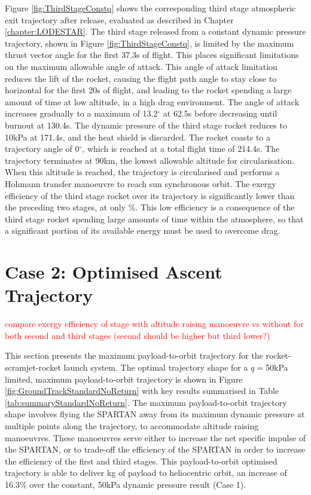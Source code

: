 Figure \ref{fig:ThirdStageConstq} shows the corresponding third stage atmospheric exit trajectory after release, evaluated as described in Chapter \ref{chapter:LODESTAR}. The third stage released from a constant dynamic pressure trajectory, shown in Figure \ref{fig:ThirdStageConstq}, is limited by the maximum thrust vector angle for the first 37.3s of flight. This places significant limitations on the maximum allowable angle of attack. This angle of attack limitation reduces the lift of the rocket, causing the flight path angle to stay close to horizontal for the first 20s of flight, and leading to the rocket spending a large amount of time at low altitude, in a high drag environment. The angle of attack increases gradually to a maximum of 13.2$^\circ$ at 62.5s before decreasing until burnout at 130.4s. The dynamic pressure of the third stage rocket reduces to 10kPa at 171.4s, and the heat shield is discarded. The rocket coasts to a trajectory angle of 0$^\circ$, which is reached at a total flight time of 214.4s. The trajectory terminates at 90km, the lowest allowable altitude for circularisation. 
When this altitude is reached, the trajectory is circularised and performs a Hohmann transfer manoeuvre to reach sun synchronous orbit.
The exergy efficiency of the third stage rocket over its trajectory is significantly lower than the preceding two stages, at only \thirddExergyEffConstq \%. This low efficiency is a consequence of the third stage rocket spending large amounts of time within the atmosphere, so that a significant portion of its available energy must be used to overcome drag.  







\section{Case 2: Optimised Ascent Trajectory}\label{sec:optimisednoreturn}

\textcolor{red}{compare exergy efficiency of stage with altitude raising manoeuvre vs without for both second and third stages (second should be higher but third lower?)}

This section presents the maximum payload-to-orbit trajectory for the rocket-scramjet-rocket launch system. 
The optimal trajectory shape for a $q=$50kPa limited, maximum payload-to-orbit trajectory is shown in Figure \ref{fig:GroundTrackStandardNoReturn} with key results summarised in Table \ref{tab:summaryStandardNoReturn}. The maximum payload-to-orbit trajectory shape involves flying the SPARTAN away from its maximum dynamic pressure at multiple points along the trajectory, to accommodate altitude raising manoeuvres. These manoeuvres serve either to increase the net specific impulse of the SPARTAN, or to trade-off the efficiency of the SPARTAN in order to increase the efficiency of the first and third stages. 
This payload-to-orbit optimised trajectory is able to deliver \PayloadToOrbitStandardNoReturn kg of payload to heliocentric orbit, an increase of 16.3\% over the constant, 50kPa dynamic pressure result (Case 1).

